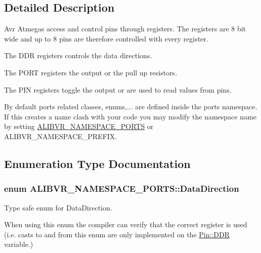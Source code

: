 \subsection{Detailed Description}
Avr Atmegas access and control pins through registers. The registers are 8 bit wide and up to 8 pins are therefore controlled with every register. 


\begin{DoxyItemize}
\item The D\+DR registers controls the data directions.
\item The P\+O\+RT registers the output or the pull up resistors.
\item The P\+IN registers toggle the output or are used to read values from pins.
\end{DoxyItemize}

By default ports related classes, enums,... are defined inside the {\ttfamily ports} namespace. If this creates a name clash with your code you may modify the namespace name by setting \hyperlink{namespaceALIBVR__NAMESPACE__PORTS}{A\+L\+I\+B\+V\+R\+\_\+\+N\+A\+M\+E\+S\+P\+A\+C\+E\+\_\+\+P\+O\+R\+TS} or A\+L\+I\+B\+V\+R\+\_\+\+N\+A\+M\+E\+S\+P\+A\+C\+E\+\_\+\+P\+R\+E\+F\+IX. 

\subsection{Enumeration Type Documentation}
\subsubsection[{\texorpdfstring{Data\+Direction}{DataDirection}}]{\setlength{\rightskip}{0pt plus 5cm}enum {\bf A\+L\+I\+B\+V\+R\+\_\+\+N\+A\+M\+E\+S\+P\+A\+C\+E\+\_\+\+P\+O\+R\+T\+S\+::\+Data\+Direction}\hspace{0.3cm}{\ttfamily [strong]}}\hypertarget{namespaceALIBVR__NAMESPACE__PORTS_a1c84bd36a7c4d1204c926927f8534ed4}{}\label{namespaceALIBVR__NAMESPACE__PORTS_a1c84bd36a7c4d1204c926927f8534ed4}


Type safe enum for Data\+Direction. 

When using this enum the compiler can verify that the correct register is used (i.\+e. casts to and from this enum are only implemented on the \hyperlink{structALIBVR__NAMESPACE__PORTS_1_1Pin_a91515b99dfbd7423ffa4771ec32bfbe8}{Pin\+::\+D\+DR} variable.)

